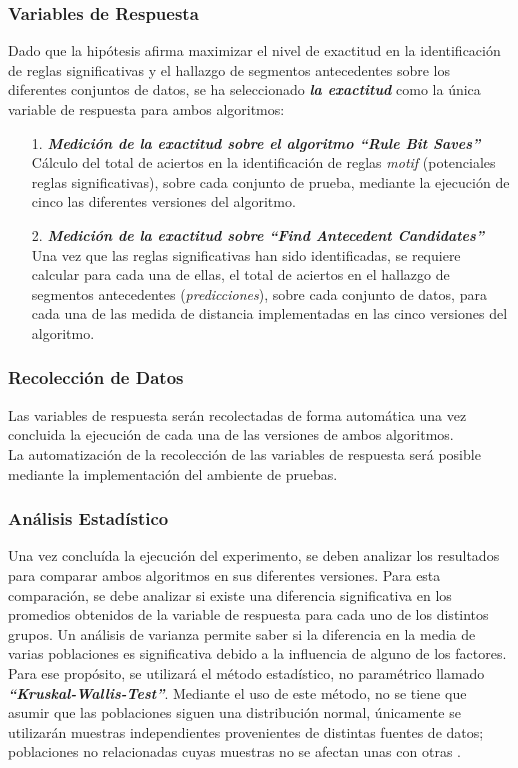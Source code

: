 \subsubsection{Variables de Respuesta}
Dado que la hip\'otesis afirma maximizar el nivel de exactitud en la identificaci\'on de reglas significativas y el hallazgo de segmentos antecedentes sobre los diferentes conjuntos de datos, se ha seleccionado \textit{\textbf{la exactitud}} como la \'unica variable de respuesta para ambos algoritmos:
\begin{itemize}
\item [1.] \textbf{\textit{Medici\'on de la exactitud sobre el algoritmo \enquote{Rule Bit Saves}}}\\
C\'alculo del total de aciertos en la identificaci\'on de reglas \textit{motif} (potenciales reglas significativas), sobre cada conjunto de prueba, mediante la ejecuci\'on de cinco las diferentes versiones del algoritmo.
\item [2.] \textit{\textbf{Medici\'on de la exactitud sobre \enquote{Find Antecedent Candidates}}}\\ 
Una vez que las reglas significativas han sido identificadas, se requiere calcular para cada una de ellas, el total de aciertos en el hallazgo de segmentos antecedentes (\textit{predicciones}), sobre cada conjunto de datos, para cada una de las medida de distancia implementadas en las cinco versiones del algoritmo.
\end{itemize}
\subsubsection{Recolecci\'on de Datos}
Las variables de respuesta ser\'an recolectadas de forma autom\'atica una vez concluida la ejecuci\'on de cada una de las versiones de ambos algoritmos.\\
La automatizaci\'on de la recolecci\'on de las variables de respuesta ser\'a posible mediante la implementaci\'on del ambiente de pruebas.
\subsubsection{An\'alisis Estad\'istico}
Una vez conclu\'ida la ejecuci\'on del experimento, se deben analizar los resultados para comparar ambos algoritmos en sus diferentes versiones. Para esta comparaci\'on, se debe analizar si existe una diferencia significativa en los promedios obtenidos de la variable de respuesta para cada uno de los distintos grupos. Un an\'alisis de varianza permite saber si la diferencia en la media de varias poblaciones es significativa debido a la influencia de alguno de los factores.\\ Para ese prop\'osito, se utilizar\'a el m\'etodo estad\'istico, no param\'etrico llamado \textit{\textbf{\enquote{Kruskal-Wallis-Test}}}. Mediante el uso de este m\'etodo, no se tiene que asumir que las poblaciones siguen una distribuci\'on normal, \'unicamente se utilizar\'an muestras independientes provenientes de distintas fuentes de datos; poblaciones no relacionadas cuyas muestras no se afectan unas con otras \cite{kruskwal}.
